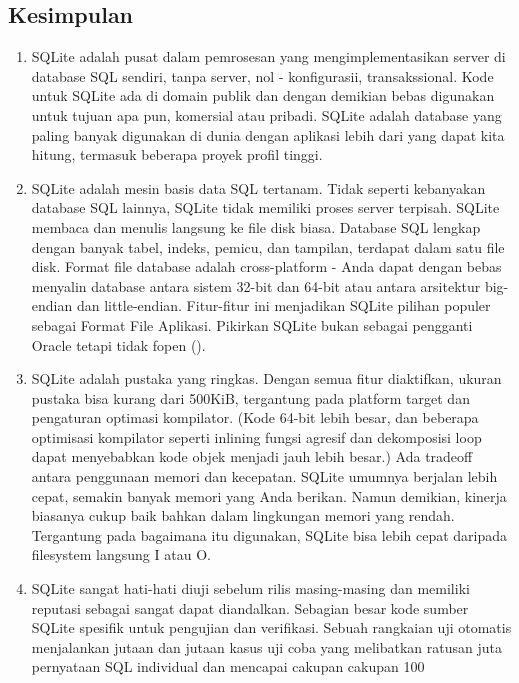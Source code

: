		\subsection{Kesimpulan}
			\begin{enumerate}
				\item SQLite adalah pusat dalam pemrosesan yang mengimplementasikan server di database SQL sendiri, tanpa server, nol - konfigurasii, transakssional. Kode untuk SQLite ada di domain publik dan dengan demikian bebas digunakan untuk tujuan apa pun, komersial atau pribadi. SQLite adalah database yang paling banyak digunakan di dunia dengan aplikasi lebih dari yang dapat kita hitung, termasuk beberapa proyek profil tinggi.
				\item SQLite adalah mesin basis data SQL tertanam. Tidak seperti kebanyakan database SQL lainnya, SQLite tidak memiliki proses server terpisah. SQLite membaca dan menulis langsung ke file disk biasa. Database SQL lengkap dengan banyak tabel, indeks, pemicu, dan tampilan, terdapat dalam satu file disk. Format file database adalah cross-platform - Anda dapat dengan bebas menyalin database antara sistem 32-bit dan 64-bit atau antara arsitektur big-endian dan little-endian. Fitur-fitur ini menjadikan SQLite pilihan populer sebagai Format File Aplikasi. Pikirkan SQLite bukan sebagai pengganti Oracle tetapi tidak fopen ().
				\item SQLite adalah pustaka yang ringkas. Dengan semua fitur diaktifkan, ukuran pustaka bisa kurang dari 500KiB, tergantung pada platform target dan pengaturan optimasi kompilator. (Kode 64-bit lebih besar, dan beberapa optimisasi kompilator seperti inlining fungsi agresif dan dekomposisi loop dapat menyebabkan kode objek menjadi jauh lebih besar.) Ada tradeoff antara penggunaan memori dan kecepatan. SQLite umumnya berjalan lebih cepat, semakin banyak memori yang Anda berikan. Namun demikian, kinerja biasanya cukup baik bahkan dalam lingkungan memori yang rendah. Tergantung pada bagaimana itu digunakan, SQLite bisa lebih cepat daripada filesystem langsung I atau O.
				\item SQLite sangat hati-hati diuji sebelum rilis masing-masing dan memiliki reputasi sebagai sangat dapat diandalkan. Sebagian besar kode sumber SQLite spesifik untuk pengujian dan verifikasi. Sebuah rangkaian uji otomatis menjalankan jutaan dan jutaan kasus uji coba yang melibatkan ratusan juta pernyataan SQL individual dan mencapai cakupan cakupan 100%

\end{enumerate}
